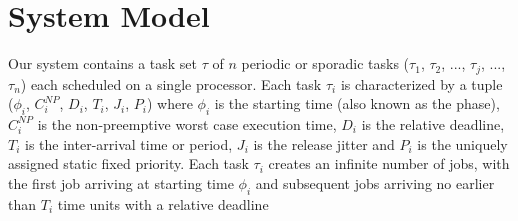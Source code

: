 \section{System Model}\label{sec:system_model}

Our system contains a task set \begin{math}\tau\end{math} of $n$ periodic or sporadic tasks (\begin{math}\tau_{1}\end{math}, \begin{math}\tau_{2}\end{math}, ..., \begin{math}\tau_{j}\end{math}, ..., \begin{math}\tau_{n}\end{math}) each scheduled on a single processor.  Each task \begin{math}\tau_{i}\end{math} is characterized by a tuple (\begin{math}\phi_{i}\end{math}, \begin{math}C_{i}^{NP}\end{math}, \begin{math}D_{i}\end{math}, \begin{math}T_{i}\end{math}, \begin{math}J_{i}\end{math}, \begin{math}P_{i}\end{math}) where \begin{math}\phi_{i}\end{math} is the starting time (also known as the phase), \begin{math}C_{i}^{NP}\end{math} is the non-preemptive worst case execution time, \begin{math}D_{i}\end{math} is the relative deadline, \begin{math}T_{i}\end{math} is the inter-arrival time or period, \begin{math}J_{i}\end{math} is the release jitter and \begin{math}P_{i}\end{math} is the uniquely assigned static fixed priority.  Each task \begin{math}\tau_{i}\end{math} creates an infinite number of jobs, with the first job arriving at starting time \begin{math}\phi_{i}\end{math} and subsequent jobs arriving no earlier than \begin{math}T_{i}\end{math} time units with a relative deadline 